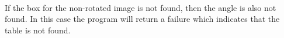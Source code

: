 \begin{figure}[H]
\centering
{}
\\
\label{fig:tablelocateoutput}
\end{figure}

If the box for the non-rotated image is not found, then the angle is also not found. In this case the program will return a failure which indicates that the table is not found.
